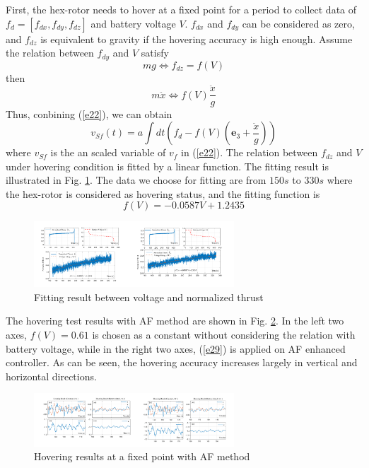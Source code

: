 \documentclass[letterpaper, 10 pt, conference]{ieeeconf}  %
\begin{document}
First, the hex-rotor needs to hover at a fixed point for a period to collect data of $f_d=[f_{dx},f_{dy},f_{dz}]$ and battery voltage $V$.
$f_{dx}$ and $f_{dy}$ can be considered as zero, and $f_{dz}$ is equivalent to gravity if the hovering accuracy is high enough.
Assume the relation between $f_{dy}$ and $V$ satisfy
\begin{equation}
    mg \Leftrightarrow f_{dz}=f(V)
    \label{e26}
\end{equation}
then
\begin{equation}
    m\ddot{x} \Leftrightarrow f(V)\frac{\ddot{x}}{g}
    \label{e27}
\end{equation}
Thus, conbining (\ref{e22}), we can obtain
\begin{equation}
    v_{Sf}(t) = a \int dt \left(
         f_d - f(V)(\bm{e}_3+\frac{\ddot{x}}{g})
        \right)
    \label{e28}
\end{equation}
where $v_{Sf}$ is the an scaled variable of $v_{f}$ in (\ref{e22}).
The relation between $f_{dz}$ and $V$ under hovering condition is fitted by a linear function.
The fitting result is illustrated in Fig. \ref{f9}.
The data we choose for fitting are from $150s$ to $330s$ where the hex-rotor is considered as hovering status, and the fitting function is
\begin{equation}
    f(V) = -0.0587V + 1.2435
    \label{e29}
\end{equation}
\begin{figure}[t]
    \centering
    \includegraphics[width=2.95in]{illustrations/fig9.pdf}
    \caption{Fitting result between voltage and normalized thrust}
    \label{f9}
\end{figure}

The hovering test results with AF method are shown in Fig. \ref{f10}.
In the left two axes, $f(V) = 0.61$ is chosen as a constant without considering the relation with battery voltage, while in the right two axes, (\ref{e29}) is applied on AF enhanced controller.
As can be seen, the hovering accuracy increases largely in vertical and horizontal directions.
\begin{figure}[t]
    \centering
    \includegraphics[width=2.95in]{illustrations/fig10.pdf}
    \caption{Hovering results at a fixed point with AF method}
    \label{f10}
\end{figure}
\end{document}
